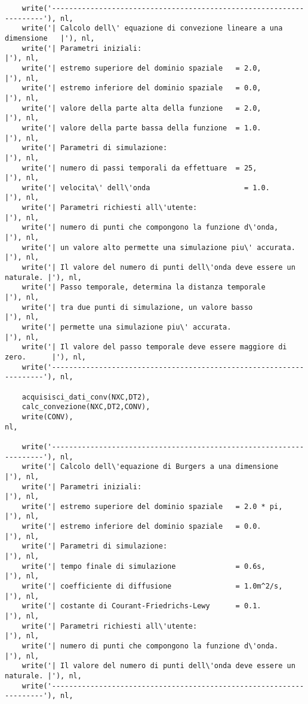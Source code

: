 \begin{verbatim}
    write('--------------------------------------------------------------------'), nl,
    write('| Calcolo dell\' equazione di convezione lineare a una dimensione   |'), nl,
    write('| Parametri iniziali:                                              |'), nl,
    write('| estremo superiore del dominio spaziale   = 2.0,                  |'), nl,
    write('| estremo inferiore del dominio spaziale   = 0.0,                  |'), nl, 
    write('| valore della parte alta della funzione   = 2.0,                  |'), nl, 
    write('| valore della parte bassa della funzione  = 1.0.                  |'), nl,
    write('| Parametri di simulazione:                                        |'), nl,
    write('| numero di passi temporali da effettuare  = 25,                   |'), nl, 
    write('| velocita\' dell\'onda                      = 1.0.                  |'), nl, 
    write('| Parametri richiesti all\'utente:                                  |'), nl, 
    write('| numero di punti che compongono la funzione d\'onda,               |'), nl,
    write('| un valore alto permette una simulazione piu\' accurata.           |'), nl,
    write('| Il valore del numero di punti dell\'onda deve essere un naturale. |'), nl,
    write('| Passo temporale, determina la distanza temporale                 |'), nl,
    write('| tra due punti di simulazione, un valore basso                    |'), nl,
    write('| permette una simulazione piu\' accurata.                          |'), nl,
    write('| Il valore del passo temporale deve essere maggiore di zero.      |'), nl,
    write('--------------------------------------------------------------------'), nl,

    acquisisci_dati_conv(NXC,DT2),                                                 
    calc_convezione(NXC,DT2,CONV), 
    write(CONV),                                                                   nl,

    write('--------------------------------------------------------------------'), nl,
    write('| Calcolo dell\'equazione di Burgers a una dimensione               |'), nl,
    write('| Parametri iniziali:                                              |'), nl,
    write('| estremo superiore del dominio spaziale   = 2.0 * pi,             |'), nl,
    write('| estremo inferiore del dominio spaziale   = 0.0.                  |'), nl, 
    write('| Parametri di simulazione:                                        |'), nl,
    write('| tempo finale di simulazione              = 0.6s,                 |'), nl, 
    write('| coefficiente di diffusione               = 1.0m^2/s,             |'), nl, 
    write('| costante di Courant-Friedrichs-Lewy      = 0.1.                  |'), nl, 
    write('| Parametri richiesti all\'utente:                                  |'), nl, 
    write('| numero di punti che compongono la funzione d\'onda.               |'), nl,
    write('| Il valore del numero di punti dell\'onda deve essere un naturale. |'), nl,
    write('--------------------------------------------------------------------'), nl,


\end{verbatim}
